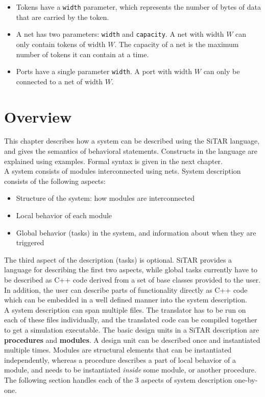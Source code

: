 \documentclass[12pt,a4paper]{report}
\begin{document}
\begin{itemize}
\item Tokens have a {\tt width} parameter, which represents the
number of bytes of data that are carried by the token.

\item A net has two parameters:
{\tt width} and {\tt capacity}. A net with width $W$ can only 
contain tokens of width $W$. The capacity of a net is the maximum number
of tokens it can contain at a time.

\item Ports have a single parameter {\tt width}. A port with width $W$ can only be 
connected to a net of width $W$.
\end{itemize}

	\section{Overview}
	This chapter describes how a system can be described using the SiTAR
	language, and gives the semantics of behavioral statements.
	Constructs in the language are explained using examples. Formal syntax is 
	given in the next chapter.\\

	A system consists of modules interconnected using nets. 
	System description consists of the following aspects:
	\begin{itemize}
	\item Structure of the system: how modules are interconnected
	\item Local behavior of each module
	\item Global behavior (tasks) in the system, and information about when they are triggered
	\end{itemize}
	The third aspect of the description (tasks) is optional.  SiTAR
	provides a language for describing the first two aspects, while global
	tasks currently have to be described as C++ code derived from a set of
	base classes provided to the user.  In addition, the user can describe
	parts of functionality directly as C++ code which can be embedded in a
	well defined manner into the system description.\\

	
	A system description  can span multiple files. The translator has to be
	run on each of these files individually, and the translated code can be compiled together
	to get a simulation executable.
	The basic design units in a SiTAR description are \textbf{procedures} and \textbf{modules}.
	A design unit can be described once and instantiated multiple times.
	Modules are structural elements that can be instantiated independently, 
	whereas a procedure describes a part of local behavior of a module, 
	and needs to be instantiated \emph{inside} some module, or another procedure.
	The following section handles each of the 3 aspects of system description one-by-one.\\
\end{document}
